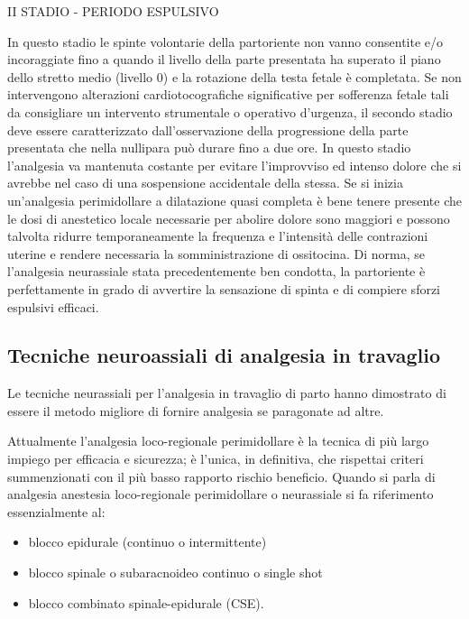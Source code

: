 \documentclass[]{article}
\begin{document}
II STADIO - PERIODO ESPULSIVO

In questo stadio le spinte volontarie della partoriente non vanno
consentite e/o incoraggiate fino a quando il livello della parte
presentata ha superato il piano dello stretto medio (livello 0) e la
rotazione della testa fetale è completata. Se non intervengono
alterazioni cardiotocografiche significative per sofferenza fetale tali
da consigliare un intervento strumentale o operativo d'urgenza, il
secondo stadio deve essere caratterizzato dall'osservazione della
progressione della parte presentata che nella nullipara può durare fino
a due ore. In questo stadio l'analgesia va mantenuta costante per
evitare l'improvviso ed intenso dolore che si avrebbe nel caso di una
sospensione accidentale della stessa. Se si inizia un'analgesia
perimidollare a dilatazione quasi completa è bene tenere presente che le
dosi di anestetico locale necessarie per abolire dolore sono maggiori e
possono talvolta ridurre temporaneamente la frequenza e l'intensità
delle contrazioni uterine e rendere necessaria la somministrazione di
ossitocina. Di norma, se l'analgesia neurassiale stata precedentemente
ben condotta, la partoriente è perfettamente in grado di avvertire la
sensazione di spinta e di compiere sforzi espulsivi efficaci.

\hypertarget{tecniche-neuroassiali-di-analgesia-in-travaglio}{%
\subsection{Tecniche neuroassiali di analgesia in
travaglio}\label{tecniche-neuroassiali-di-analgesia-in-travaglio}}

Le tecniche neurassiali per l'analgesia in travaglio di parto hanno
dimostrato di essere il metodo migliore di fornire analgesia se
paragonate ad altre.

Attualmente l'analgesia loco-regionale perimidollare è la tecnica di più
largo impiego per efficacia e sicurezza; è l'unica, in definitiva, che
rispettai criteri summenzionati con il più basso rapporto rischio
beneficio. Quando si parla di analgesia anestesia loco-regionale
perimidollare o neurassiale si fa riferimento essenzialmente al:

\begin{itemize}
\item
  blocco epidurale (continuo o intermittente)
\item
  blocco spinale o subaracnoideo continuo o single shot
\item
  blocco combinato spinale-epidurale (CSE).
\end{itemize}
\end{document}
